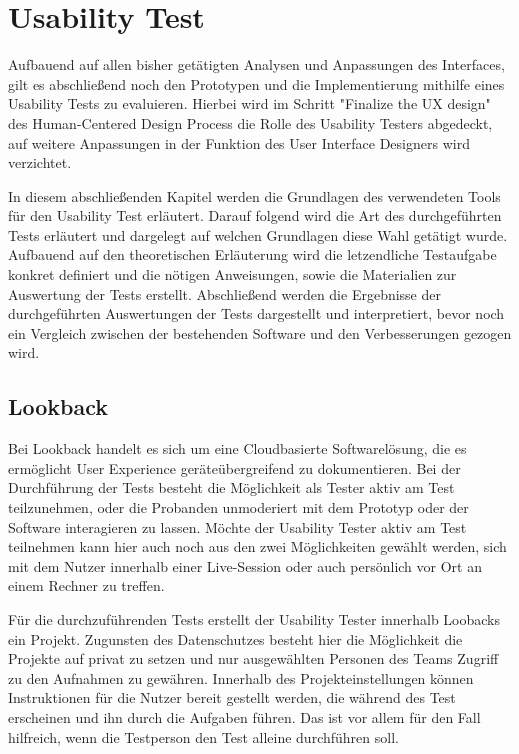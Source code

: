 \chapter{Usability Test}\label{ch:outlook}

Aufbauend auf allen bisher getätigten Analysen und Anpassungen des Interfaces, gilt es abschließend noch den Prototypen und die Implementierung mithilfe eines Usability Tests zu evaluieren.
Hierbei wird im Schritt "Finalize the UX design" des Human-Centered Design Process die Rolle des Usability Testers abgedeckt, auf weitere Anpassungen in der Funktion des User Interface Designers wird verzichtet.

In diesem abschließenden Kapitel werden die Grundlagen des verwendeten Tools für den Usability Test erläutert.
Darauf folgend wird die Art des durchgeführten Tests erläutert und dargelegt auf welchen Grundlagen diese Wahl getätigt wurde.
Aufbauend auf den theoretischen Erläuterung wird die letzendliche Testaufgabe konkret definiert und die nötigen Anweisungen, sowie die Materialien zur Auswertung der Tests erstellt.
Abschließend werden die Ergebnisse der durchgeführten Auswertungen der Tests dargestellt und interpretiert, bevor noch ein Vergleich zwischen der bestehenden Software und den Verbesserungen gezogen wird.

\section{Lookback}

Bei Lookback handelt es sich um eine Cloudbasierte Softwarelösung, die es ermöglicht User Experience geräteübergreifend zu dokumentieren.
Bei der Durchführung der Tests besteht die Möglichkeit als Tester aktiv am Test teilzunehmen, oder die Probanden unmoderiert mit dem Prototyp oder der Software interagieren zu lassen.
Möchte der Usability Tester aktiv am Test teilnehmen kann hier auch noch aus den zwei Möglichkeiten gewählt werden, sich mit dem Nutzer innerhalb einer Live-Session oder  auch persönlich vor Ort an einem Rechner zu treffen.

Für die durchzuführenden Tests erstellt der Usability Tester innerhalb Loobacks ein Projekt.
Zugunsten des Datenschutzes besteht hier die Möglichkeit die Projekte auf privat zu setzen und nur ausgewählten Personen des Teams Zugriff zu den Aufnahmen zu gewähren.
Innerhalb des Projekteinstellungen können Instruktionen für die Nutzer bereit gestellt werden, die während des Test erscheinen und ihn durch die Aufgaben führen.
Das ist vor allem für den Fall hilfreich, wenn die Testperson den Test alleine durchführen soll.

